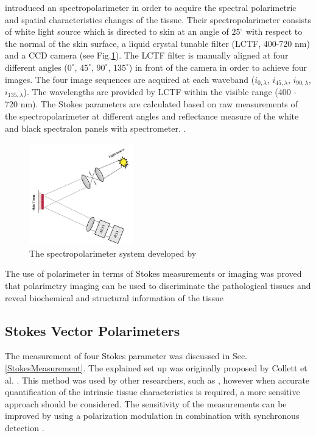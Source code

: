 \documentclass[oneside,a4,12p]{report} %
\begin{document}
\cite{zhao2009} introduced an spectropolarimeter in order to acquire the spectral polarimetric and spatial characteristics changes of the tissue. Their spectropolarimeter consists of white light source which is directed to skin at an angle of $25^{\circ}$ with respect to the normal of the skin surface, a liquid crystal tunable filter (LCTF, 400-720 nm) and a CCD camera (see Fig.\ref{fig:spectropolarimeter}). The LCTF filter is manually aligned at four different angles ($0^{\circ}$, $45^{\circ}$, $90^{\circ}$, $135^{\circ}$) in front of the camera in order to achieve four images. The four image sequences are acquired at each waveband ($i_{0,\lambda}$, $i_{45,\lambda}$, $i_{90,\lambda}$, $i_{135,\lambda}$). The wavelengths are provided by LCTF within the visible range (400 - 720 nm).
The Stokes parameters are calculated based on raw measurements of the spectropolarimeter at different angles and reflectance measure of the white and black spectralon panels with spectrometer. \cite{zhao2009}.
		\begin{figure}
		\centering
		\includegraphics[width = 0.4\textwidth]{figures/spectropolarimeter.png}	
	\caption{The spectropolarimeter system developed by \cite{zhao2009}}
		\label{fig:spectropolarimeter}
		\end{figure}	 


The use of polarimeter in terms of Stokes measurements or imaging was proved that polarimetry imaging can be used to discriminate the pathological tissues and reveal biochemical and structural information of the tissue 



	
	\subsection{Stokes Vector Polarimeters}
	
	The measurement of four Stokes parameter was discussed in Sec. \ref{StokesMeasurement}. The explained set up was originally proposed by Collett et al. \cite{collett1984measurement}. This method was used by other researchers, such as \cite{ghosh2003depolarization,sankaran1999polarization,zhao2009,boulbry2006novel}, however when accurate quantification of the intrinsic tissue characteristics is required, a more sensitive approach should be considered. The sensitivity of the measurements can be improved by using a polarization modulation in combination with synchronous detection \cite{coa2004balanced,vitkin2002effects,studinski2000methodology,guo2006angular}. 
	
\end{document}
